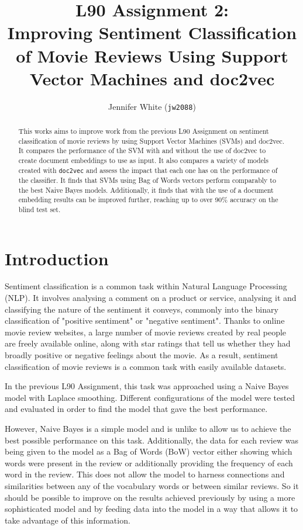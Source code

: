 \documentclass[twocolumn]{article}
\title{ L90 Assignment 2:\\
	Improving Sentiment Classification of Movie Reviews Using Support Vector Machines and doc2vec }
\author{Jennifer White (\texttt{jw2088})}
\date{}
\begin{document}
\maketitle
\begin{abstract}
This works aims to improve work from the previous L90 Assignment on sentiment classification of movie reviews by using Support Vector Machines (SVMs) and doc2vec. It compares the performance of the SVM with and without the use of doc2vec to create document embeddings to use as input. It also compares a variety of models created with \texttt{doc2vec} and assess the impact that each one has on the performance of the classifier. It finds that SVMs using Bag of Words vectors perform comparably to the best Naive Bayes models. Additionally, it finds that with the use of a document embedding results can be improved further, reaching up to over 90\% accuracy on the blind test set.
\end{abstract}

\section{Introduction}

Sentiment classification is a common task within Natural Language Processing (NLP). It involves analysing a comment on a product or service, analysing it and classifying the nature of the sentiment it conveys, commonly into the binary classification of "positive sentiment" or "negative sentiment". Thanks to online movie review websites, a large number of movie reviews created by real people are freely available online, along with star ratings that tell us whether they had broadly positive or negative feelings about the movie. As a result, sentiment classification of movie reviews is a common task with easily available datasets.

In the previous L90 Assignment, this task was approached using a Naive Bayes model with Laplace smoothing. Different configurations of the model were tested and evaluated in order to find the model that gave the best performance.

However, Naive Bayes is a simple model and is unlike to allow us to achieve the best possible performance on this task. Additionally, the data for each review was being given to the model as a Bag of Words (BoW) vector either showing which words were present in the review or additionally providing the frequency of each word in the review. This does not allow the model to harness connections and similarities between any of the vocabulary words or between similar reviews. So it should be possible to improve on the results achieved previously by using a more sophisticated model and by feeding data into the model in a way that allows it to take advantage of this information.
\end{document}
